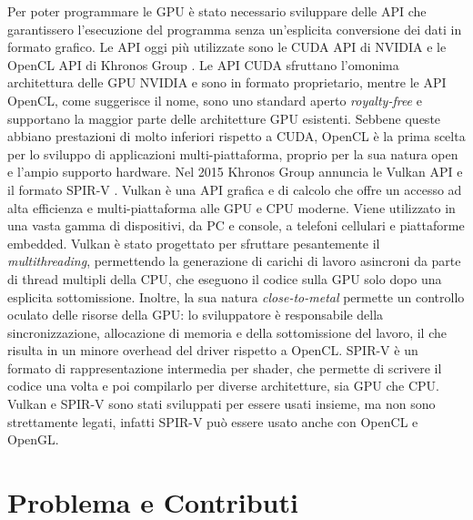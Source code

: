 Per poter programmare le \gls{GPU} è stato necessario sviluppare delle \gls{API} che garantissero l'esecuzione del programma senza un'esplicita conversione dei dati in formato grafico. Le \gls{API} oggi più utilizzate sono le \gls{CUDA} \gls{API} di NVIDIA \cite[]{NVIDIA:CUDA} e le OpenCL \gls{API} di Khronos Group \cite[]{KG:OpenCL}. Le \gls{API} \gls{CUDA} sfruttano l'omonima architettura delle \gls{GPU} NVIDIA e sono in formato proprietario, mentre le \gls{API} OpenCL, come suggerisce il nome, sono uno standard aperto \textit{royalty-free} e supportano la maggior parte delle architetture \gls{GPU} esistenti. Sebbene queste abbiano prestazioni di molto inferiori rispetto a CUDA, OpenCL è la prima scelta per lo sviluppo di applicazioni multi-piattaforma, proprio per la sua natura open e l'ampio supporto hardware. Nel 2015 Khronos Group annuncia le Vulkan \gls{API} \cite[]{KG:Vulkan} e il formato \gls{SPIR-V} \cite[]{KG:SPIR-V}. Vulkan è una \gls{API} grafica e di calcolo che offre un accesso ad alta efficienza e multi-piattaforma alle \gls{GPU} e \gls{CPU} moderne. Viene utilizzato in una vasta gamma di dispositivi, da PC e console, a telefoni cellulari e piattaforme embedded. Vulkan è stato progettato per sfruttare pesantemente il \textit{multithreading}, permettendo la generazione di carichi di lavoro asincroni da parte di thread multipli della \gls{CPU}, che eseguono il codice sulla \gls{GPU} solo dopo una esplicita sottomissione. Inoltre, la sua natura \textit{close-to-metal} permette un controllo oculato delle risorse della \gls{GPU}: lo sviluppatore è responsabile della sincronizzazione, allocazione di memoria e della sottomissione del lavoro, il che risulta in un minore overhead del driver rispetto a OpenCL. \gls{SPIR-V} è un formato di rappresentazione intermedia per shader, che permette di scrivere il codice una volta e poi compilarlo per diverse architetture, sia \gls{GPU} che \gls{CPU}. Vulkan e \gls{SPIR-V} sono stati sviluppati per essere usati insieme, ma non sono strettamente legati, infatti \gls{SPIR-V} può essere usato anche con OpenCL e OpenGL.

\section[Problema e Contributi]{Problema e Contributi}

